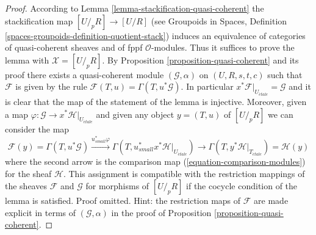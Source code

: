 \documentclass[10pt,a4paper]{amsart}
\theoremstyle{plain}
\theoremstyle{definition}
\theoremstyle{remark}
\numberwithin{equation}{subsection}
\def\etale{{\acute{e}tale}}
\begin{document}
\begin{proof}
According to
Lemma \ref{lemma-stackification-quasi-coherent}
the stackification map $[U/_{\!p}R] \to [U/R]$ (see
Groupoids in Spaces, Definition
\ref{spaces-groupoids-definition-quotient-stack})
induces an equivalence of categories of quasi-coherent sheaves
and of fppf $\mathcal{O}$-modules.
Thus it suffices to prove the lemma with $\mathcal{X} = [U/_{\!p}R]$.
By Proposition \ref{proposition-quasi-coherent}
and its proof there exists a quasi-coherent module
$(\mathcal{G}, \alpha)$ on $(U, R, s, t, c)$ such that
$\mathcal{F}$ is given by the rule
$\mathcal{F}(T, u) = \Gamma(T, u^*\mathcal{G})$.
In particular $x^*\mathcal{F}|_{U_\etale} = \mathcal{G}$
and it is clear that the map of the statement of the
lemma is injective. Moreover, given a map
$\varphi : \mathcal{G} \to x^*\mathcal{H}|_{U_\etale}$
and given any object
$y = (T, u)$ of $[U/_{\!p}R]$ we can consider the map
$$
\mathcal{F}(y) = \Gamma(T, u^*\mathcal{G})
\xrightarrow{u_{small}^*\varphi}
\Gamma(T, u_{small}^*x^*\mathcal{H}|_{U_\etale})
\rightarrow
\Gamma(T, y^*\mathcal{H}|_{T_\etale}) = \mathcal{H}(y)
$$
where the second arrow is the comparison map
(\ref{equation-comparison-modules}) for the sheaf $\mathcal{H}$.
This assignment is compatible with the restriction mappings of the
sheaves $\mathcal{F}$ and $\mathcal{G}$ for morphisms of
$[U/_{\!p}R]$ if the cocycle condition of
the lemma is satisfied. Proof omitted. Hint: the restriction maps
of $\mathcal{F}$ are made explicit in terms of $(\mathcal{G}, \alpha)$
in the proof of
Proposition \ref{proposition-quasi-coherent}.
\end{proof}
\end{document}

